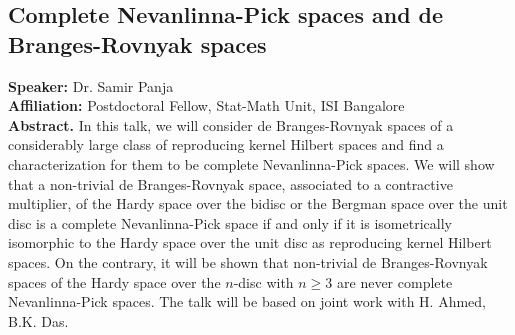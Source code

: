 \subsection*{Complete Nevanlinna-Pick spaces and  de Branges-Rovnyak spaces} %
\noindent
\textbf{Speaker:} Dr. Samir Panja \\ %
\textbf{Affiliation:} Postdoctoral Fellow, Stat-Math Unit, ISI Bangalore \\ %

\noindent\textbf{Abstract.} In this talk, we  will consider de Branges-Rovnyak spaces of a considerably large class of reproducing kernel Hilbert spaces and find a characterization for them to be complete Nevanlinna-Pick spaces. 
    We will show that a non-trivial de Branges-Rovnyak space, associated to a contractive multiplier, of the Hardy space over the bidisc or the Bergman space over the unit disc is a complete Nevanlinna-Pick space if and only if it is isometrically isomorphic to the Hardy space over the unit disc as reproducing kernel Hilbert spaces. On the contrary, it will be shown that non-trivial de Branges-Rovnyak spaces of the Hardy space over the $n$-disc with $n\geq 3$ are never complete Nevanlinna-Pick spaces.  The talk will be based on joint work with H. Ahmed, B.K. Das.


